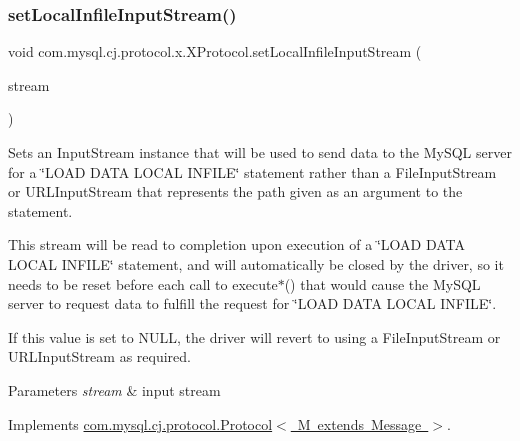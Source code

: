 \mbox{\label{classcom_1_1mysql_1_1cj_1_1protocol_1_1x_1_1_x_protocol_a4f539adc72747ef03c94bc92acde5efb}} 
\subsubsection{\texorpdfstring{set\+Local\+Infile\+Input\+Stream()}{setLocalInfileInputStream()}}
{\footnotesize\ttfamily void com.\+mysql.\+cj.\+protocol.\+x.\+X\+Protocol.\+set\+Local\+Infile\+Input\+Stream (\begin{DoxyParamCaption}\item[{Input\+Stream}]{stream }\end{DoxyParamCaption})}

Sets an Input\+Stream instance that will be used to send data to the My\+S\+QL server for a \char`\"{}\+L\+O\+A\+D D\+A\+T\+A L\+O\+C\+A\+L I\+N\+F\+I\+L\+E\char`\"{} statement rather than a File\+Input\+Stream or U\+R\+L\+Input\+Stream that represents the path given as an argument to the statement.

This stream will be read to completion upon execution of a \char`\"{}\+L\+O\+A\+D D\+A\+T\+A L\+O\+C\+A\+L I\+N\+F\+I\+L\+E\char`\"{} statement, and will automatically be closed by the driver, so it needs to be reset before each call to execute$\ast$() that would cause the My\+S\+QL server to request data to fulfill the request for \char`\"{}\+L\+O\+A\+D D\+A\+T\+A L\+O\+C\+A\+L I\+N\+F\+I\+L\+E\char`\"{}.

If this value is set to N\+U\+LL, the driver will revert to using a File\+Input\+Stream or U\+R\+L\+Input\+Stream as required.


\begin{DoxyParams}{Parameters}
{\em stream} & input stream \\
\hline
\end{DoxyParams}


Implements \mbox{\hyperlink{interfacecom_1_1mysql_1_1cj_1_1protocol_1_1_protocol_a995483a591a66d63e273140ef0ac47e7}{com.\+mysql.\+cj.\+protocol.\+Protocol$<$ M extends Message $>$}}.

